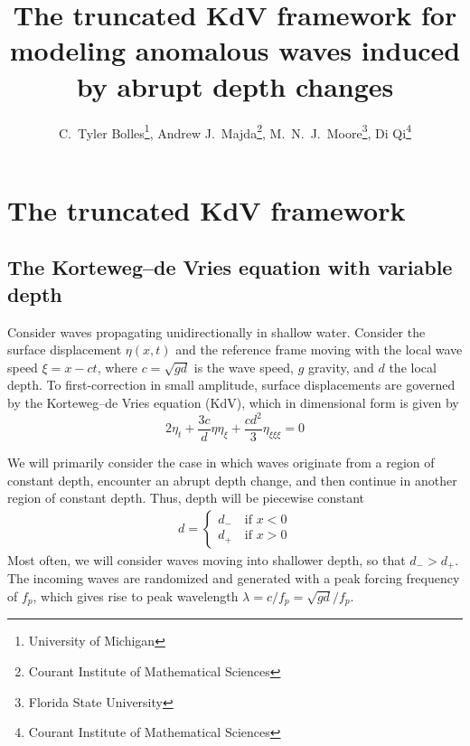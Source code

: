 \documentclass[11pt]{article}
\newcommand{\freqp}{f_p}
\newcommand{\depth}{d}
\newcommand{\dup}{\depth_{-}}
\newcommand{\ddn}{\depth_{+}}
\newcommand{\lam}{\lambda}
\begin{document}
\title{The truncated KdV framework for modeling anomalous waves induced by abrupt depth changes}

\author{
C.~Tyler Bolles\thanks{University of Michigan},
Andrew J.~Majda\thanks{Courant Institute of Mathematical Sciences}, 
M.~N.~J.~Moore\thanks{Florida State University}, 
Di Qi\thanks{Courant Institute of Mathematical Sciences} }
\maketitle



\section{The truncated KdV framework}


\subsection{The Korteweg–de Vries equation with variable depth}
Consider waves propagating unidirectionally in shallow water. Consider the surface displacement $\eta(x,t)$ and the reference frame moving with the local wave speed $\xi = x - ct$, where $c = \sqrt{g \depth}$ is the wave speed, $g$ gravity, and $\depth$ the local depth.
To first-correction in small amplitude, surface displacements are governed by the Korteweg–de Vries equation (KdV), which in dimensional form is given by
\begin{equation}
2 \eta_t + \frac{3 c}{\depth} \eta \eta_{\xi} + \frac{c \depth^2}{3} \eta_{\xi \xi \xi} = 0
\end{equation}

We will primarily consider the case in which waves originate from a region of constant depth, encounter an abrupt depth change, and then continue in another region of constant depth. Thus, depth will be piecewise constant
\begin{align}
\depth = 
\begin{cases}
\dup \quad \mbox{if } x<0 \\
\ddn \quad \mbox{if } x>0
\end{cases}
\end{align}
Most often, we will consider waves moving into shallower depth, so that $\dup > \ddn$. The incoming waves are randomized and generated with a peak forcing frequency of $\freqp$, which gives rise to peak wavelength $\lam = c/\freqp = \sqrt{g \depth} / \freqp$.
\end{document}
